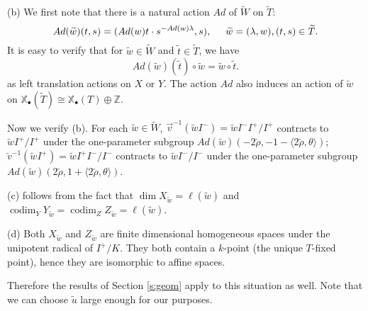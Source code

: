 \documentclass{amsart}
\theoremstyle{plain}
\theoremstyle{definition}
\theoremstyle{remark}
\numberwithin{equation}{subsection}
\begin{document}
(b) We first note that there is a natural action $Ad$ of ${\widetilde{W}}$ on ${\widetilde{T}}$:
\begin{equation*}
Ad({\widetilde{w}})(t,s)=(Ad(w)t\cdot s^{-Ad(w)\lambda},s),\hspace{.5cm}{\widetilde{w}}=(\lambda,w),(t,s)\in{\widetilde{T}}.
\end{equation*}
It is easy to verify that for ${\widetilde{w}}\in{\widetilde{W}}$ and ${\widetilde{t}}\in{\widetilde{T}}$, we have
\begin{equation*}
Ad({\widetilde{w}})({\widetilde{t}})\circ{\widetilde{w}}={\widetilde{w}}\circ{\widetilde{t}}.
\end{equation*}
as left translation actions on $X$ or $Y$. The action $Ad$ also induces an action of ${\widetilde{w}}$ on ${\mathbb{X}_\bullet}({\widetilde{T}})\cong{\mathbb{X}_\bullet}(T)\oplus{\mathbb{Z}}$. 
 
Now we verify (b). For each ${\widetilde{w}}\in{\widetilde{W}}$, $\overrightarrow{v}^{-1}({\widetilde{w}} I^-)={\widetilde{w}} I^-I^+/I^+$ contracts to ${\widetilde{w}} I^+/I^+$ under the one-parameter subgroup $Ad({\widetilde{w}})(-2\check{\rho},-1-\langle2\check{\rho},\theta\rangle)$; $\overleftarrow{v}^{-1}({\widetilde{w}} I^+)={\widetilde{w}} I^+I^-/I^-$ contracts to ${\widetilde{w}} I^-/I^-$ under the one-parameter subgroup $Ad({\widetilde{w}})(2\check{\rho},1+\langle2\check{\rho},\theta\rangle)$.

(c) follows from the fact that $\dim X_{\widetilde{w}}=\ell({\widetilde{w}})$ and $\operatorname{codim}_Y Y_{\widetilde{w}}=\operatorname{codim}_Z Z_{\widetilde{w}}=\ell({\widetilde{w}})$.

(d) Both $X_{\widetilde{w}}$ and $Z_{\widetilde{w}}$ are finite dimensional homogeneous spaces under the unipotent radical of $I^+/K$. They both contain a $k$-point (the unique $T$-fixed point), hence they are isomorphic to affine spaces.

Therefore the results of Section \ref{s:geom} apply to this situation as well. Note that we can choose ${\widetilde{u}}$ large enough for our purposes. 
\end{document}
